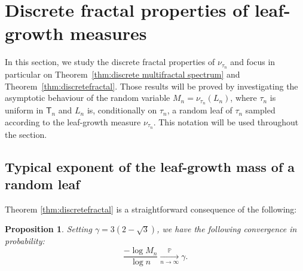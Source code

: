 \documentclass[11pt]{article}
\newcommand{\dH}{\gamma}
\newcommand{\pr}{\mathbb{P}}
\newcommand{\sT}{\mathsf{T}} %
\newtheorem{prop}[thm]{Proposition}
\begin{document}
\section{Discrete fractal properties of  leaf-growth measures}
In this section, we study the discrete fractal properties of $\nu_{\tau_n}$ and focus in particular on Theorem~\ref{thm:discrete multifractal spectrum} and Theorem~\ref{thm:discretefractal}. Those results will be proved by investigating the asymptotic behaviour of the random variable $M_n=\nu_{\tau_n}(L_n)$, where $\tau_n$ is uniform in $\sT_n$ and $L_n$ is, conditionally on $\tau_n$, a random leaf of $\tau_n$ sampled according to the leaf-growth measure $\nu_{\tau_n}$. This notation will be used throughout the section.

\subsection{Typical exponent of the leaf-growth mass of a random leaf}\label{section:discrete Hausdorff}
Theorem \ref{thm:discretefractal} is a straightforward consequence of the following:
\begin{prop}
Setting $\dH=3(2-\sqrt{3})$, we have the following convergence in probability:
\[\frac{-\log M_n}{\log n} \underset{n\to\infty}{\overset{\pr}{\longrightarrow}} \dH.\]
\end{prop}
\end{document}
